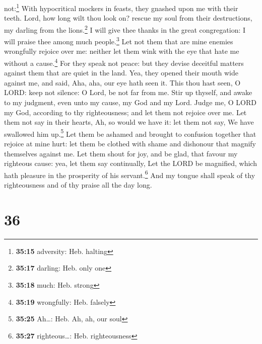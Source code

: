 not:\footnote{\textbf{35:15} adversity: Heb. halting} 
With hypocritical mockers in feasts, they gnashed upon me with their
teeth.  Lord, how long wilt thou look on? rescue my soul
from their destructions, my darling from the lions.\footnote{\textbf{35:17}
  darling: Heb. only one}  I will give thee thanks in the
great congregation: I will praise thee among much people.\footnote{\textbf{35:18}
  much: Heb. strong}  Let not them that are mine enemies
wrongfully rejoice over me: neither let them wink with the eye that hate
me without a cause.\footnote{\textbf{35:19} wrongfully: Heb. falsely}
 For they speak not peace: but they devise deceitful
matters against them that are quiet in the land.  Yea,
they opened their mouth wide against me, and said, Aha, aha, our eye
hath seen it.  This thou hast seen, O LORD: keep not
silence: O Lord, be not far from me.  Stir up thyself,
and awake to my judgment, even unto my cause, my God and my Lord.
 Judge me, O LORD my God, according to thy righteousness;
and let them not rejoice over me.  Let them not say in
their hearts, Ah, so would we have it: let them not say, We have
swallowed him up.\footnote{\textbf{35:25} Ah\ldots: Heb. Ah, ah, our
  soul}  Let them be ashamed and brought to confusion
together that rejoice at mine hurt: let them be clothed with shame and
dishonour that magnify themselves against me.  Let them
shout for joy, and be glad, that favour my righteous cause: yea, let
them say continually, Let the LORD be magnified, which hath pleasure in
the prosperity of his servant.\footnote{\textbf{35:27} righteous\ldots:
  Heb. righteousness}  And my tongue shall speak of thy
righteousness and of thy praise all the day long.

\hypertarget{section-35}{%
\section{36}\label{section-35}}

